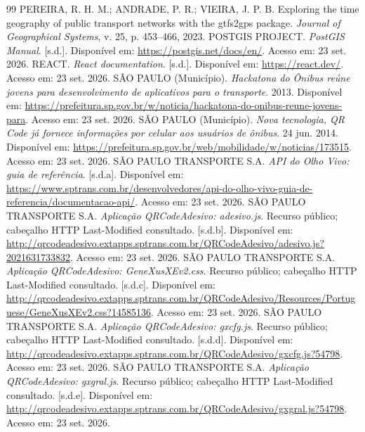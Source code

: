 \documentclass[12pt,oneside,a4paper,brazil]{abntex2}
\begin{document}
\begin{thebibliography}{99}
 PEREIRA, R. H. M.; ANDRADE, P. R.; VIEIRA, J. P. B. Exploring the time geography of public transport networks with the gtfs2gps package. \textit{Journal of Geographical Systems}, v. 25, p. 453--466, 2023.
 POSTGIS PROJECT. \textit{PostGIS Manual}. [s.d.]. Disponível em: \url{https://postgis.net/docs/en/}. Acesso em: 23 set. 2026.
 REACT. \textit{React documentation}. [s.d.]. Disponível em: \url{https://react.dev/}. Acesso em: 23 set. 2026.
 SÃO PAULO (Município). \textit{Hackatona do Ônibus reúne jovens para desenvolvimento de aplicativos para o transporte}. 2013. Disponível em: \url{https://prefeitura.sp.gov.br/w/noticia/hackatona-do-onibus-reune-jovens-para}. Acesso em: 23 set. 2026.
 SÃO PAULO (Município). \textit{Nova tecnologia, QR Code já fornece informações por celular aos usuários de ônibus}. 24 jun. 2014. Disponível em: \url{https://prefeitura.sp.gov.br/web/mobilidade/w/noticias/173515}. Acesso em: 23 set. 2026.
 SÃO PAULO TRANSPORTE S.A. \textit{API do Olho Vivo: guia de referência}. [s.d.a]. Disponível em: \url{https://www.sptrans.com.br/desenvolvedores/api-do-olho-vivo-guia-de-referencia/documentacao-api/}. Acesso em: 23 set. 2026.
 SÃO PAULO TRANSPORTE S.A. \textit{Aplicação QRCodeAdesivo: adesivo.js}. Recurso público; cabeçalho HTTP Last-Modified consultado. [s.d.b]. Disponível em: \url{http://qrcodeadesivo.extapps.sptrans.com.br/QRCodeAdesivo/adesivo.js?2021631733832}. Acesso em: 23 set. 2026.
 SÃO PAULO TRANSPORTE S.A. \textit{Aplicação QRCodeAdesivo: GeneXusXEv2.css}. Recurso público; cabeçalho HTTP Last-Modified consultado. [s.d.c]. Disponível em: \url{http://qrcodeadesivo.extapps.sptrans.com.br/QRCodeAdesivo/Resources/Portuguese/GeneXusXEv2.css?14585136}. Acesso em: 23 set. 2026.
 SÃO PAULO TRANSPORTE S.A. \textit{Aplicação QRCodeAdesivo: gxcfg.js}. Recurso público; cabeçalho HTTP Last-Modified consultado. [s.d.d]. Disponível em: \url{http://qrcodeadesivo.extapps.sptrans.com.br/QRCodeAdesivo/gxcfg.js?54798}. Acesso em: 23 set. 2026.
 SÃO PAULO TRANSPORTE S.A. \textit{Aplicação QRCodeAdesivo: gxgral.js}. Recurso público; cabeçalho HTTP Last-Modified consultado. [s.d.e]. Disponível em: \url{http://qrcodeadesivo.extapps.sptrans.com.br/QRCodeAdesivo/gxgral.js?54798}. Acesso em: 23 set. 2026.

\end{thebibliography}
\end{document}
